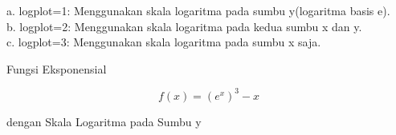 \documentclass{article}
\begin{document}
\begin{eulernotebook}
\begin{eulercomment}
\begin{eulercomment}
\begin{eulercomment}
\begin{eulercomment}
\begin{eulercomment}
\begin{eulercomment}
\begin{eulercomment}
\begin{eulercomment}
\begin{eulercomment}
\begin{eulercomment}
\begin{eulercomment}
\begin{eulercomment}
\begin{eulercomment}
\begin{eulercomment}
\begin{eulercomment}
\begin{eulercomment}
\begin{eulercomment}
\begin{eulercomment}
\begin{eulercomment}
\begin{eulercomment}
\begin{eulercomment}
\begin{eulercomment}
\begin{eulercomment}
\begin{eulercomment}
\begin{eulercomment}
\begin{eulercomment}
\begin{eulercomment}
a. logplot=1: Menggunakan skala logaritma pada sumbu y(logaritma basis
e).\\
b. logplot=2: Menggunakan skala logaritma pada kedua sumbu x dan y.\\
c. logplot=3: Menggunakan skala logaritma pada sumbu x saja.

\begin{eulercomment}
\begin{eulercomment}
Fungsi Eksponensial\\
\end{eulercomment}
\begin{eulerformula}
\[
f(x)=(e^x)^3-x
\]
\end{eulerformula}
\begin{eulercomment}
dengan Skala Logaritma pada Sumbu y


\end{eulercomment}
\end{eulercomment}
\end{eulercomment}
\end{eulercomment}
\end{eulercomment}
\end{eulercomment}
\end{eulercomment}
\end{eulercomment}
\end{eulercomment}
\end{eulercomment}
\end{eulercomment}
\end{eulercomment}
\end{eulercomment}
\end{eulercomment}
\end{eulercomment}
\end{eulercomment}
\end{eulercomment}
\end{eulercomment}
\end{eulercomment}
\end{eulercomment}
\end{eulercomment}
\end{eulercomment}
\end{eulercomment}
\end{eulercomment}
\end{eulercomment}
\end{eulercomment}
\end{eulercomment}
\end{eulercomment}
\end{eulercomment}
\end{eulernotebook}
\end{document}

